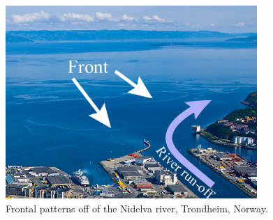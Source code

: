 \documentclass[aoas]{imsart}
\begin{document}
\begin{figure}[!h] 
\centering 
\includegraphics[width=0.85\textwidth]{Figures/pictures/c-updated.pdf}
\caption{Frontal patterns off of the Nidelva river, Trondheim, Norway.}
\label{fig:nidelven}
\end{figure}

\end{document}
